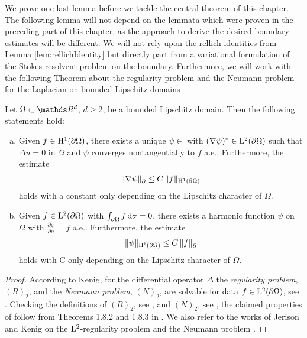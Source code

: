 We prove one last lemma before we tackle the central theorem of this chapter.
The following lemma will not depend on the lemmata which were proven in the preceding part of this chapter, as the approach to derive the desired boundary estimates will be different:
We will not rely upon the rellich identities from Lemma \ref{lem:rellichIdentity} but directly part from a variational formulation of the Stokes resolvent problem on the boundary. 
Furthermore, we will work with the following Theorem about the regularity problem and the Neumann problem for the Laplacian on bounded Lipschitz domains
\begin{thm}
  \label{thm:jerisonKenig}
  Let $\Omega \subset \R^d$, $d \geq 2$, be a bounded Lipschitz domain. Then the following statements hold:
  \begin{enumerate}[a)]
    \item Given $f \in \mathrm{H}^1(\partial\Omega)$, there exists a unique $\psi \in$ with $(\nabla \psi)^* \in \mathrm{L}^2(\partial\Omega)$ such that $\Delta u = 0$ in $\Omega$ and $\psi$ converges nontangentially to $f$ a.e.. Furthermore, the estimate 
      \begin{align*}
          \|\nabla\psi\|^{}_\partial \leq C\, \|f\|_{\mathrm{H}^1(\partial\Omega)}
      \end{align*}
      holds with a constant only depending on the Lipschitz character of $\Omega$.
    \item Given $f \in \mathrm{L}^2(\partial\Omega)$ with $\int_{\partial\Omega} f \, {\operatorname{d}\!{\sigma}} = 0$, there exists a harmonic function $\psi$ on $\Omega$ with $\frac{\partial\psi}{\partial n} = f$ a.e.. Furthermore, the estimate
      \begin{align*}
          \| \psi\|_{\mathrm{H}^1(\partial\Omega)} \leq C\, \|f\|^{}_\partial
      \end{align*}
      holds with C only depending on the Lipschitz character of $\Omega$.
  \end{enumerate}
\end{thm}

\begin{proof}
  According to Kenig, for the differential operator $\Delta$ the \emph{regularity problem}, $(R)_2$, and the \emph{Neumann problem}, $(N)_2$,  are solvable for data $f \in \mathrm{L}^2(\partial\Omega)$, see \cite[Thm. 2.1.10]{kenigBook}.
  Checking the definitions of $(R)_2$, see \cite[Defn. 1.7.10]{kenigBook}, and $(N)_2$, see \cite[Defn. 1.7.9]{kenigBook}, the claimed properties of follow from Theorems 1.8.2 and 1.8.3 in \cite[Chap. 1]{kenigBook}.
  We also refer to the works of Jerison and Kenig on the $\mathrm{L}^2$-regularity problem \cite{jerisonKenig2} and the Neumann problem \cite{jerisonKenig}.
\end{proof}

